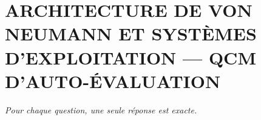 
\section*{\textcolor{chapcolor}{\MakeUppercase{Architecture de von Neumann et systèmes d'exploitation — QCM d'auto-évaluation}}}

\begin{center}
\textit{Pour chaque question, une seule réponse est exacte.}
\end{center}

